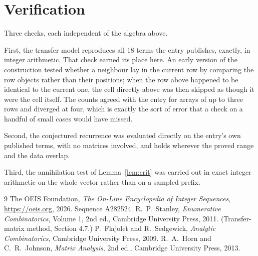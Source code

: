 \documentclass[11pt,a4paper]{article}
\theoremstyle{plain}
\theoremstyle{definition}
\begin{document}
\section{Verification}

Three checks, each independent of the algebra above.

First, the transfer model reproduces all $18$ terms the entry publishes, exactly, in
integer arithmetic. That check earned its place here. An early version of the construction
tested whether a neighbour lay in the current row by comparing the row objects rather
than their positions; when the row above happened to be identical to the current one, the
cell directly above was then skipped as though it were the cell itself. The counts agreed with
the entry for arrays of up to three rows and diverged at four, which is exactly the sort of
error that a check on a handful of small cases would have missed.

Second, the conjectured recurrence was evaluated directly on the entry's own published terms,
with no matrices involved, and holds wherever the proved range and the data overlap.

Third, the annihilation test of Lemma~\ref{lem:crit} was carried out in exact integer
arithmetic on the whole vector rather than on a sampled prefix.

\begin{thebibliography}{9}
 The OEIS Foundation, \emph{The On-Line Encyclopedia of Integer
Sequences}, \url{https://oeis.org}, 2026. Sequence A282524.
 R.~P.~Stanley, \emph{Enumerative Combinatorics}, Volume 1, 2nd ed.,
Cambridge University Press, 2011. (Transfer-matrix method, Section 4.7.)
 P.~Flajolet and R.~Sedgewick, \emph{Analytic Combinatorics}, Cambridge
University Press, 2009.
 R.~A.~Horn and C.~R.~Johnson, \emph{Matrix Analysis}, 2nd ed., Cambridge
University Press, 2013.
\end{thebibliography}
\end{document}
